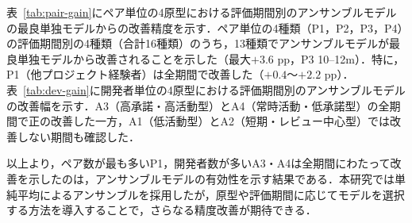 \documentclass[submit,noauthor,ses,dvipdfmx]{ipsj}
\begin{document}
表~\ref{tab:pair-gain}にペア単位の4原型における評価期間別のアンサンブルモデルの最良単独モデルからの改善精度を示す．ペア単位の4種類（P1，P2，P3，P4）の評価期間別の4種類（合計16種類）のうち，13種類でアンサンブルモデルが最良単独モデルから改善されることを示した（最大$+3.6$ pp，P3 10--12m）．特に，P1（他プロジェクト経験者）は全期間で改善した（$+0.4$〜$+2.2$ pp）．表~\ref{tab:dev-gain}に開発者単位の4原型における評価期間別のアンサンブルモデルの改善幅を示す．A3（高承諾・高活動型）とA4（常時活動・低承諾型）の全期間で正の改善した一方，A1（低活動型）とA2（短期・レビュー中心型）では改善しない期間も確認した．

以上より，ペア数が最も多いP1，開発者数が多いA3・A4は全期間にわたって改善を示したのは，アンサンブルモデルの有効性を示す結果である．本研究では単純平均によるアンサンブルを採用したが，原型や評価期間に応じてモデルを選択する方法を導入することで，さらなる精度改善が期待できる．
\end{document}
